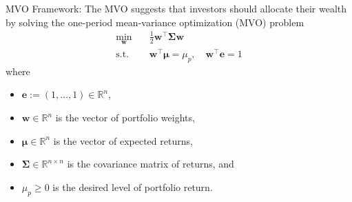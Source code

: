 \documentclass[13pt]{article}
\theoremstyle{definition}
\theoremstyle{remark}
\begin{document}
{\color{C6} MVO Framework:} The MVO suggests that investors should allocate their wealth by solving the one-period mean-variance optimization (MVO) problem 
\begin{align*}
    \min _{\bm{w}} \quad & \frac{1}{2} \bm{w}^{\top} \mathbf{\Sigma} \bm{w} \\
    \text {s.t.} \quad  & \bm{w}^{\top} \bm{\mu}=\mu_{p}, \quad  
 \bm{w}^{\top} \bm{e}=1
\end{align*}
where
\begin{itemize}
    \item $\bm{e}:=(1, \ldots, 1) \in \mathbb{R}^{n}$,
    \item $\bm{w} \in \mathbb{R}^{n}$ is the vector of portfolio weights,
    \item $\bm{\mu} \in \mathbb{R}^{n}$ is the vector of expected returns,
    \item $\mathbf{\Sigma} \in \mathbb{R}^{n \times n}$ is the covariance matrix of returns, and
    \item $\mu_{p} \geq 0$ is the desired level of portfolio return.
\end{itemize}
\end{document}
